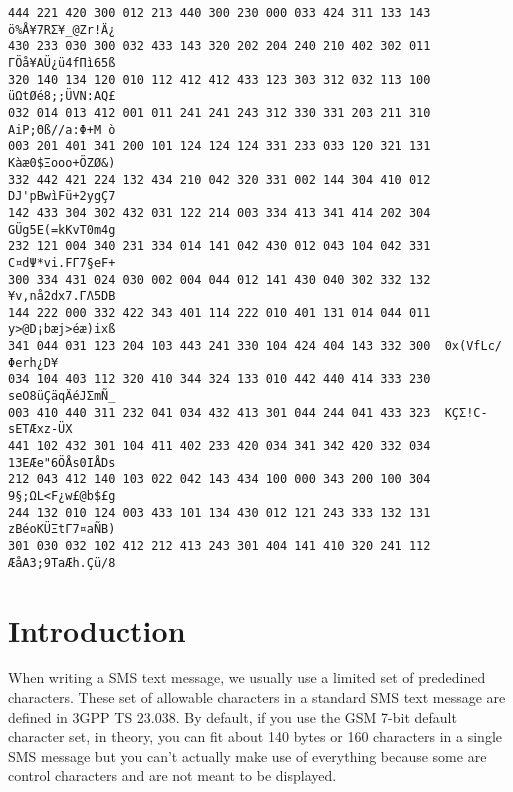 \documentclass{article}
\begin{document}
\begin{Verbatim}[fontsize=\small]
444 221 420 300 012 213 440 300 230 000 033 424 311 133 143  ö%Å¥7RΣ¥_@Zr!Ä¿
430 233 030 300 032 433 143 320 202 204 240 210 402 302 011  ΓÖå¥AÜ¿ü4fΠì65ß
320 140 134 120 010 112 412 412 433 123 303 312 032 113 100  üΩtØé8;;ÜVN:AQ£
032 014 013 412 001 011 241 241 243 312 330 331 203 211 310  AiP;Θß//a:Φ+M ò
003 201 401 341 200 101 124 124 124 331 233 033 120 321 131  Kàæ0$Ξooo+ÖZØ&)
332 442 421 224 132 434 210 042 320 331 002 144 304 410 012  DJ'pBwìFü+2ygÇ7
142 433 304 302 432 031 122 214 003 334 413 341 414 202 304  GÜg5E(=kKvT0m4g
232 121 004 340 231 334 014 141 042 430 012 043 104 042 331  C¤dΨ*vi.FΓ7§eF+
300 334 431 024 030 002 004 044 012 141 430 040 302 332 132  ¥v,nå2dx7.ΓΛ5DB
144 222 000 332 422 343 401 114 222 010 401 131 014 044 011  y>@D¡bæj>éæ)ixß
341 044 031 123 204 103 443 241 330 104 424 404 143 332 300  0x(VfLc/Φerh¿D¥
034 104 403 112 320 410 344 324 133 010 442 440 414 333 230  seO8üÇäqÄéJΣmÑ_
003 410 440 311 232 041 034 432 413 301 044 244 041 433 323  KÇΣ!C-sETÆxz-ÜX
441 102 432 301 104 411 402 233 420 034 341 342 420 332 034  13EÆe"6ÖÅs0IÅDs
212 043 412 140 103 022 042 143 434 100 000 343 200 100 304  9§;ΩL<F¿w£@b$£g
244 132 010 124 003 433 101 134 430 012 121 243 333 132 131  zBéoKÜΞtΓ7¤aÑB)
301 030 032 102 412 212 413 243 301 404 141 410 320 241 112  ÆåA3;9TaÆh.Çü/8
\end{Verbatim}

\newpage


\section{Introduction}

When writing a SMS text message, we usually use a limited
set of prededined characters. These set of allowable characters in
a standard SMS text message are defined in 3GPP TS
23.038. By default, if you use the GSM 7-bit default character
set, in theory, you can fit about 140 bytes or 160 characters in a single
SMS message but you can't actually make use of everything  because some
are control characters and are not meant to be displayed.

\medskip
\end{document}
